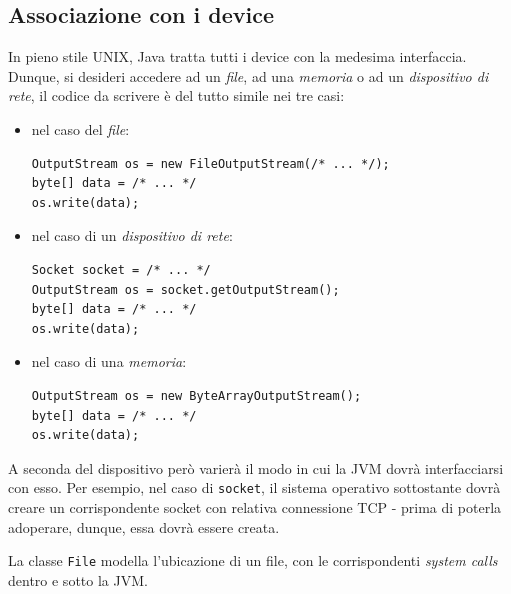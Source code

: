 \documentclass[\fontsizeclass,twocolumn]{\classname}
\theoremstyle{definition}
\theoremstyle{definition}
\begin{document}
\subsection{Associazione con i device}

In pieno stile UNIX, Java tratta tutti i device con la medesima interfaccia.
Dunque, si desideri accedere ad un \emph{file}, ad una \emph{memoria} o ad un
\emph{dispositivo di rete}, il codice da scrivere è del tutto simile nei tre
casi:

\begin{itemize}
    \item nel caso del \emph{file}:
\begin{lstlisting}
OutputStream os = new FileOutputStream(/* ... */);
byte[] data = /* ... */
os.write(data);
\end{lstlisting}
    \item nel caso di un \emph{dispositivo di rete}:
\begin{lstlisting}
Socket socket = /* ... */
OutputStream os = socket.getOutputStream();
byte[] data = /* ... */
os.write(data);
\end{lstlisting}
    \item nel caso di una \emph{memoria}:
\begin{lstlisting}
OutputStream os = new ByteArrayOutputStream();
byte[] data = /* ... */
os.write(data);
\end{lstlisting}
\end{itemize}

A seconda del dispositivo però varierà il modo in cui la JVM dovrà
interfacciarsi con esso. Per esempio, nel caso di \texttt{socket},
il sistema operativo sottostante dovrà creare un corrispondente socket
con relativa connessione TCP \-- prima di poterla adoperare, dunque, essa dovrà
essere creata.

La classe \texttt{File} modella l'ubicazione di un file, con le corrispondenti
\emph{system calls} dentro e sotto la JVM.
\end{document}
